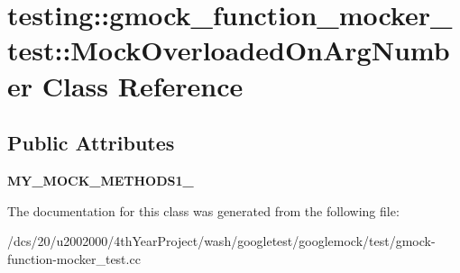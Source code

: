 \hypertarget{classtesting_1_1gmock__function__mocker__test_1_1MockOverloadedOnArgNumber}{}\section{testing\+:\+:gmock\+\_\+function\+\_\+mocker\+\_\+test\+:\+:Mock\+Overloaded\+On\+Arg\+Number Class Reference}
\label{classtesting_1_1gmock__function__mocker__test_1_1MockOverloadedOnArgNumber}
\subsection*{Public Attributes}
\begin{DoxyCompactItemize}
\item 
\mbox{\label{classtesting_1_1gmock__function__mocker__test_1_1MockOverloadedOnArgNumber_a251bfa5d95ae7a52ccfc9b541fac2ea5}} 
{\bfseries M\+Y\+\_\+\+M\+O\+C\+K\+\_\+\+M\+E\+T\+H\+O\+D\+S1\+\_\+}
\end{DoxyCompactItemize}


The documentation for this class was generated from the following file\+:\begin{DoxyCompactItemize}
\item 
/dcs/20/u2002000/4th\+Year\+Project/wash/googletest/googlemock/test/gmock-\/function-\/mocker\+\_\+test.\+cc\end{DoxyCompactItemize}
